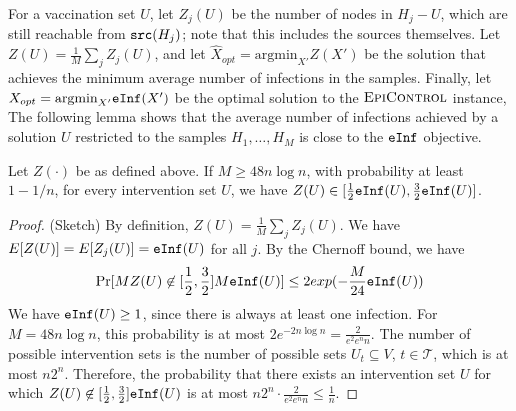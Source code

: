 For a vaccination set $U$, let $Z_j(U)$ be the number of nodes in 
$H_j-U$, which are still reachable from $\texttt{src}(H_j)$;
note that this includes the sources themselves.
Let $Z(U)=\frac{1}{M}\sum_j Z_j(U)$, and let $\hat{X}_{opt}=\mbox{argmin}_{X'}Z(X')$ be the solution that
achieves the minimum average number of infections in the samples.
Finally, let $X_{opt}=\mbox{argmin}_{X'}\texttt{eInf}(X')$ be the optimal solution to the $\textsc{EpiControl}{}$ instance,
The following lemma shows that the average number of infections achieved by a solution $U$ restricted to
the samples $H_1,\ldots,H_M$ is close to the $\texttt{eInf}$ objective.

\begin{lemma}
\label{lemma:conc}
Let $Z(\cdot)$ be as defined above. If $M\geq 48n\log{n}$, with probability at least $1-1/n$, for every intervention set $U$,
we have $Z(U)\in [\frac{1}{2}\texttt{eInf}(U), \frac{3}{2}\texttt{eInf}(U)]$.
\end{lemma}
\begin{proof} (Sketch)
By definition, $Z(U)=\frac{1}{M}\sum_j Z_j(U)$.
We have $E[Z(U)] = E[Z_j(U)]=\texttt{eInf}(U)$ for all $j$.
By the Chernoff bound, we have
\[
\Pr[MZ(U)\not\in [\frac{1}{2}, \frac{3}{2}]M\texttt{eInf}(U)]\leq 2exp(-\frac{M}{24}\texttt{eInf}(U))
\]
We have $\texttt{eInf}(U)\geq 1$, since there is always at least one infection.
For $M=48n\log{n}$, this probability is at most $2e^{-2n\log{n}} = \frac{2}{e^2e^nn}$.
The number of possible intervention sets is the number of possible sets $U_t\subseteq V$, $t\in\mathcal{T}$,
which is at most $n2^n$.
Therefore, the probability that there exists an intervention set $U$ for which
$Z(U)\not\in [\frac{1}{2}, \frac{3}{2}]\texttt{eInf}(U)$ is at most $n2^n\cdot \frac{2}{e^2e^nn}\leq \frac{1}{n}$.
\end{proof}

